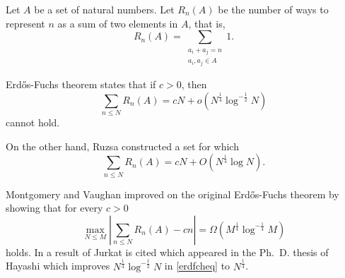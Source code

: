 \documentclass[12pt]{article}
\begin{document}

Let $A$ be a set of natural numbers. Let $R_n(A)$ be the number of ways to represent $n$ as a sum of two elements in $A$, that is, 
\begin{equation*}
R_n(A)=\sum_{\substack{a_i+a_j=n\\a_i,a_j \in A}} 1.
\end{equation*}

Erd\H{o}s-Fuchs theorem \cite{cite:erdos_fuchs_lowbnd, cite:halberstam_sequences} states that if $c>0$, then
\begin{equation}\label{erdfcheq}
\sum_{n \leq N} R_n(A)=c N + o\left(N^{\frac{1}{4}}\log^{-\frac{1}{2}}N\right)
\end{equation}
cannot hold.

On the other hand, Ruzsa \cite{cite:ruzsa_upperdfch} constructed a set for which
\begin{equation*}
\sum_{n \leq N} R_n(A)=c N + O\left(N^{\frac{1}{4}}\log N\right).
\end{equation*}

Montgomery and Vaughan \cite{cite:montgomery_vaughan_fch} improved on the original Erd\H{o}s-Fuchs theorem by showing that for every $c>0$ 
\begin{equation*}
\max_{N\leq M}\left\lvert \sum_{n \leq N} R_n(A)-c n\right\rvert=
\Omega\left(M^{\frac{1}{4}}\log^{-\frac{1}{4}}M\right)
\end{equation*}
holds. In \cite{cite:montgomery_vaughan_fch} a result of Jurkat is cited
which appeared
in the Ph.~D. thesis of Hayashi \cite{cite:hayashi_fch} which 
improves $N^{\frac{1}{4}}\log^{-\frac{1}{2}}N$ in \eqref{erdfcheq} to $N^{\frac{1}{4}}$. 
\end{document}
